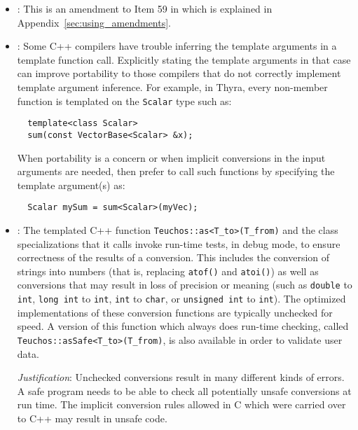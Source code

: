 \begin{itemize}

\item\GCGSafeNamespaceUsage: This is an amendment to Item 59 in
  {}\cite{C++CodingStandards05} which is explained in
  Appendix~\ref{sec:using_amendments}.

\item\GCGExplicitTemplateArguments: Some C++ compilers have trouble
  inferring the template arguments in a template function call.
  Explicitly stating the template arguments in that case can improve
  portability to those compilers that do not correctly implement
  template argument inference.  For example, in Thyra, every
  non-member function is templated on the \texttt{Scalar} type such
  as:

{\small\begin{verbatim}
  template<class Scalar>
  sum(const VectorBase<Scalar> &x);
\end{verbatim}}

When portability is a concern or when implicit conversions in the input
arguments are needed, then prefer to call such functions by specifying the
template argument(s) as:

{\small\begin{verbatim}
  Scalar mySum = sum<Scalar>(myVec);
\end{verbatim}}


\item\GCGTeuchosAs: The templated C++ function
  \texttt{Teuchos::as<T\_to>(T\_from)} and the class specializations
  that it calls invoke run-time tests, in debug mode, to ensure
  correctness of the results of a conversion.  This includes the
  conversion of strings into numbers (that is, replacing
  \texttt{atof()} and \texttt{atoi()}) as well as conversions that may
  result in loss of precision or meaning (such as \texttt{double} to
  \texttt{int}, \texttt{long int} to \texttt{int}, \texttt{int} to
  \texttt{char}, or \texttt{unsigned int} to \texttt{int}).  The
  optimized implementations of these conversion functions are
  typically unchecked for speed.  A version of this function which
  always does run-time checking, called
  \texttt{Teuchos\-::asSafe\-<\-T\_to\->\-(\-T\_from\-)}, is also
  available in order to validate user data.

  \textit{Justification}: Unchecked conversions result in many
  different kinds of errors.  A safe program needs to be able to check
  all potentially unsafe conversions at run time.  The implicit
  conversion rules allowed in C which were carried over to C++ may
  result in unsafe code.


\end{itemize}
